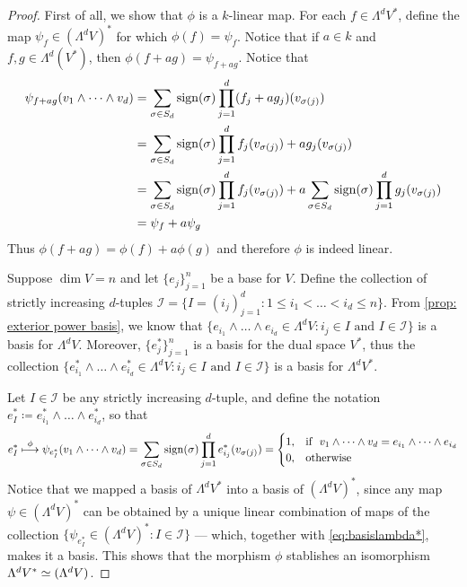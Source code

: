 \begin{proof}
First of all, we show that \(\phi\) is a \(k\)-linear map. For each \(f \in
\Lambda^d V^{*}\), define the map \(\psi_{f} \in (\Lambda^dV)^{*}\) for which
\(\phi(f) = \psi_f\). Notice that if \(a \in k\) and \(f, g \in
\Lambda^d(V^{*})\), then \(\phi(f + a g) = \psi_{f + a g}\). Notice that
\begin{align*}
  \psi_{f + ag}(v_1 \wedge \dots \wedge v_d)
  &= \sum_{\sigma \in S_d} \operatorname{sign}(\sigma)
    \prod_{j=1}^d (f_{j} + a g_{j})(v_{\sigma(j)}) \\
  &= \sum_{\sigma \in S_d} \operatorname{sign}(\sigma)
    \prod_{j=1}^d f_j(v_{\sigma(j)}) + a g_j(v_{\sigma(j)}) \\
  &= \sum_{\sigma \in S_d} \operatorname{sign}(\sigma) \prod_{j=1}^d f_j(v_{\sigma(j)})
  + a \sum_{\sigma \in S_d} \operatorname{sign}(\sigma) \prod_{j=1}^d g_j(v_{\sigma(j)}) \\
  &= \psi_f + a \psi_g
\end{align*}
Thus \(\phi(f + ag) = \phi(f) + a \phi(g)\) and therefore \(\phi\) is indeed
linear.

Suppose \(\dim V = n\) and let \(\{e_{j}\}_{j=1}^n\) be a base for \(V\). Define
the collection of strictly increasing \(d\)-tuples \(\mathcal I = \{I =
(i_{j})_{j=1}^d : 1 \leq i_1 < \dots < i_d \leq n\}\). From \cref{prop: exterior
power basis}, we know that \(\{e_{i_{1}} \wedge \dots \wedge e_{i_{d}} \in
\Lambda^d V: i_j \in I \text{ and } I \in \mathcal I\}\) is a basis for
\(\Lambda^d V\). Moreover, \(\{e_{j}^{*}\}_{j=1}^n\) is a basis for the dual
space \(V^{*}\), thus the collection \(\{e_{i_{1}}^{*} \wedge \dots \wedge
e_{i_{d}}^{*} \in \Lambda^d V: i_j \in I \text{ and } I \in \mathcal I\}\) is a
basis for \(\Lambda^d V^{*}\).

Let \(I \in \mathcal I\) be any strictly increasing \(d\)-tuple, and define the
notation \(e_I^{*} \coloneq e_{i_1}^{*} \wedge \dots \wedge e_{i_d}^{*}\), so
that
\begin{equation}
  \label{eq:basislambda*}
  e_I^{*} \overset{\phi}\longmapsto
  \psi_{e_I^{*}}(v_1 \wedge \dots \wedge v_d)
  = \sum_{\sigma \in S_{d}} \operatorname{sign}(\sigma) \prod_{j=1}^d e_{i_j}^{*}(v_{\sigma(j)}) =
  \begin{cases}
    1, &\text{if }\ v_1 \wedge \dots \wedge v_d
         = e_{i_1} \wedge \dots \wedge e_{i_d} \\
    0, &\text{otherwise}
  \end{cases}
\end{equation}
Notice that we mapped a basis of \(\Lambda^d V^{*}\) into a basis of
\((\Lambda^d V)^{*}\), since any map \(\psi \in (\Lambda^d V)^{*}\) can be
obtained by a unique linear combination of maps of the collection
\(\{\psi_{e_{I}^{*}} \in (\Lambda^d V)^{*} : I \in \mathcal I\}\) --- which,
together with \cref{eq:basislambda*}, makes it a basis. This shows that the
morphism \(\phi\) stablishes an isomorphism \(\Lambda^dV^{*} \simeq (\Lambda^d
V)\).
\end{proof}

